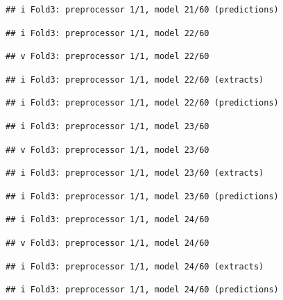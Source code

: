 \documentclass[
]{article}
\begin{document}
\begin{verbatim}
## i Fold3: preprocessor 1/1, model 21/60 (predictions)
\end{verbatim}

\begin{verbatim}
## i Fold3: preprocessor 1/1, model 22/60
\end{verbatim}

\begin{verbatim}
## v Fold3: preprocessor 1/1, model 22/60
\end{verbatim}

\begin{verbatim}
## i Fold3: preprocessor 1/1, model 22/60 (extracts)
\end{verbatim}

\begin{verbatim}
## i Fold3: preprocessor 1/1, model 22/60 (predictions)
\end{verbatim}

\begin{verbatim}
## i Fold3: preprocessor 1/1, model 23/60
\end{verbatim}

\begin{verbatim}
## v Fold3: preprocessor 1/1, model 23/60
\end{verbatim}

\begin{verbatim}
## i Fold3: preprocessor 1/1, model 23/60 (extracts)
\end{verbatim}

\begin{verbatim}
## i Fold3: preprocessor 1/1, model 23/60 (predictions)
\end{verbatim}

\begin{verbatim}
## i Fold3: preprocessor 1/1, model 24/60
\end{verbatim}

\begin{verbatim}
## v Fold3: preprocessor 1/1, model 24/60
\end{verbatim}

\begin{verbatim}
## i Fold3: preprocessor 1/1, model 24/60 (extracts)
\end{verbatim}

\begin{verbatim}
## i Fold3: preprocessor 1/1, model 24/60 (predictions)
\end{verbatim}
\end{document}
